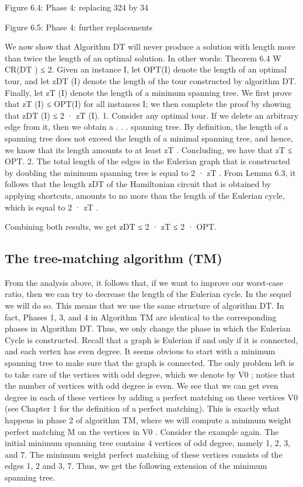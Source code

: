 Figure 6.4: Phase 4: replacing 324 by 34

Figure 6.5: Phase 4: further replacements

We now show that Algorithm DT will never produce a solution with length more than twice the length
of an optimal solution. In other words:
Theorem 6.4 W CR(DT ) ≤ 2.
Given an instance I, let OPT(I) denote the length of an optimal tour, and let zDT (I) denote the length
of the tour constructed by algorithm DT. Finally, let zT (I) denote the length of a minimum spanning
tree. We first prove that zT (I) ≤ OPT(I) for all instances I; we then complete the proof by showing
that zDT (I) ≤ 2 · zT (I).
1. Consider any optimal tour. If we delete an arbitrary edge from it, then we obtain a . . . spanning tree.
By definition, the length of a spanning tree does not exceed the length of a minimal spanning tree,
and hence, we know that its length amounts to at least zT . Concluding, we have that zT ≤ OPT.
2. The total length of the edges in the Eulerian graph that is constructed by doubling the minimum
spanning tree is equal to 2 · zT . From Lemma 6.3, it follows that the length zDT of the Hamiltonian
circuit that is obtained by applying shortcuts, amounts to no more than the length of the Eulerian
cycle, which is equal to 2 · zT .

Combining both results, we get zDT ≤ 2 · zT ≤ 2 · OPT.

\subsection{The tree-matching algorithm (TM)}

From the analysis above, it follows that, if we want to improve our worst-case ratio, then we can try to
decrease the length of the Eulerian cycle. In the sequel we will do so. This means that we use the same
structure of algorithm DT. In fact, Phases 1, 3, and 4 in Algorithm TM are identical to the corresponding
phases in Algorithm DT. Thus, we only change the phase in which the Eulerian Cycle is constructed.
Recall that a graph is Eulerian if and only if it is connected, and each vertex has even degree. It seems
obvious to start with a minimum spanning tree to make sure that the graph is connected. The only
problem left is to take care of the vertices with odd degree, which we denote by V0 ; notice that the
number of vertices with odd degree is even. We see that we can get even degree in each of these vertices
by adding a perfect matching on these vertices V0 (see Chapter 1 for the definition of a perfect matching).
This is exactly what happens in phase 2 of algorithm TM, where we will compute a minimum weight
perfect matching M on the vertices in V0 .
Consider the example again. The initial minimum spanning tree contains 4 vertices of odd degree, namely
1, 2, 3, and 7. The minimum weight perfect matching of these vertices consists of the edges {1, 2} and
{3, 7}. Thus, we get the following extension of the minimum spanning tree.

